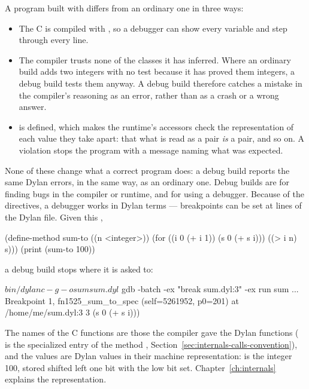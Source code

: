 A program built with  differs from an ordinary one in three ways:

\begin{itemize}
\item The C is compiled with , so a debugger can show every
  variable and step through every line.
\item The compiler trusts none of the classes it has inferred. Where an
  ordinary build adds two integers with no test because it has proved
  them integers, a debug build tests them anyway. A debug build therefore
  catches a mistake in the compiler's reasoning as an error, rather than
  as a crash or a wrong answer.
\item {} is defined, which makes the runtime's accessors
  check the representation of each value they take apart: that what is
  read as a pair \emph{is} a pair, and so on. A violation stops the
  program with a message naming what was expected.
\end{itemize}

None of these change what a correct program does: a debug build reports
the same Dylan errors, in the same way, as an ordinary one. Debug builds
are for finding bugs in the compiler or runtime, and for using a
debugger. Because of the  directives, a debugger works in
Dylan terms --- breakpoints can be set at lines of the Dylan file. Given
this ,

\begin{dylan}
(define-method sum-to ((n <integer>))
  (for ((i 0 (+ i 1))
        (s 0 (+ s i)))
       ((> i n) s)))
(print (sum-to 100))
\end{dylan}

\noindent a debug build stops where it is asked to:

\begin{shell}
$ bin/dylanc -g -o sum sum.dyl
$ gdb -batch -ex "break sum.dyl:3" -ex run sum
...
Breakpoint 1, fn1525_sum_to_spec (self=5261952, p0=201)
    at /home/me/sum.dyl:3
3               (s 0 (+ s i)))
\end{shell}

The names of the C functions are those the compiler gave the Dylan
functions ( is the specialized entry of the
method , Section~\ref{sec:internals-calls-convention}), and
the values are Dylan values in their machine representation: 
is the integer 100, stored shifted left one bit with the low bit set.
Chapter~\ref{ch:internals} explains the representation.

